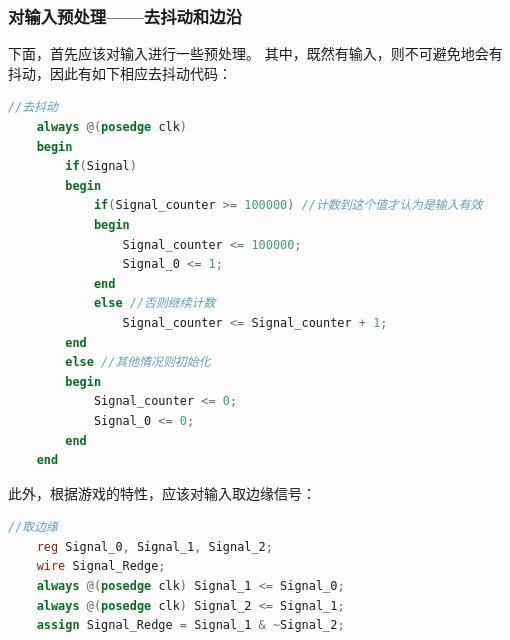 \documentclass[UTF8]{article}
\newcommand{\jumpline} {\hspace*{\fill} \par}
\begin{document}
	\subsubsection{对输入预处理——去抖动和边沿}
	下面，首先应该对输入进行一些预处理。
	其中，既然有输入，则不可避免地会有抖动，因此有如下相应去抖动代码：\par
	\begin{lstlisting}[language=Verilog, name=输入去抖动]
	//去抖动
	always @(posedge clk)
	begin
		if(Signal)
		begin
			if(Signal_counter >= 100000) //计数到这个值才认为是输入有效
			begin
				Signal_counter <= 100000;        
				Signal_0 <= 1;
			end
			else //否则继续计数
				Signal_counter <= Signal_counter + 1;
		end
		else //其他情况则初始化
		begin
			Signal_counter <= 0;
			Signal_0 <= 0;
		end
	end
	\end{lstlisting}\par
	此外，根据游戏的特性，应该对输入取边缘信号：\par
	\begin{lstlisting}[language=Verilog, name=输入取边缘]
	//取边缘
	reg Signal_0, Signal_1, Signal_2;
	wire Signal_Redge;
	always @(posedge clk) Signal_1 <= Signal_0;
	always @(posedge clk) Signal_2 <= Signal_1;
	assign Signal_Redge = Signal_1 & ~Signal_2;
	\end{lstlisting}\par
	\jumpline
\end{document}
